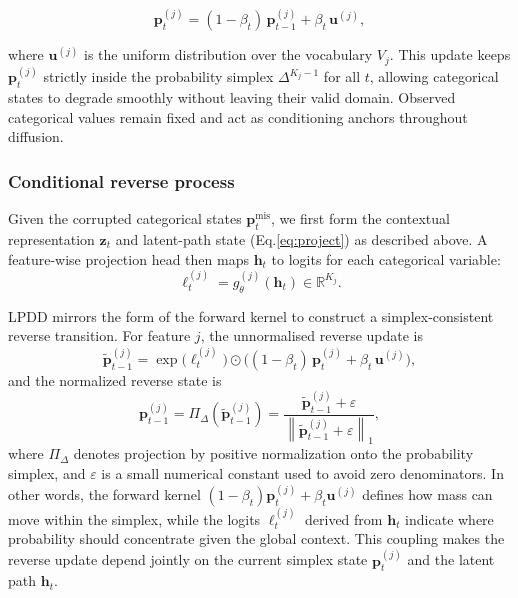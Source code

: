 \documentclass[times, review, 10pt]{elsarticle}
\begin{document}
\[
\mathbf{p}_{t}^{(j)}
= (1-\beta_t)\,\mathbf{p}_{t-1}^{(j)} + \beta_t\,\mathbf{u}^{(j)},
\]

where $\mathbf{u}^{(j)}$ is the uniform distribution over the vocabulary
$V_j$. This update keeps $\mathbf{p}_{t}^{(j)}$ strictly inside the
probability simplex $\Delta^{K_j-1}$ for all $t$, allowing categorical states
to degrade smoothly without leaving their valid domain. Observed categorical
values remain fixed and act as conditioning anchors throughout diffusion.


\subsubsection{Conditional reverse process}

Given the corrupted categorical states $\mathbf{p}_t^{\mathrm{mis}}$, we first
form the contextual representation $\mathbf{z}_t$ and latent-path state
(Eq.\ref{eq:project}) as described
above. A feature-wise projection head then maps $\mathbf{h}_t$ to logits for
each categorical variable:
\begin{equation}
\boldsymbol{\ell}_t^{(j)} = g_\theta^{(j)}(\mathbf{h}_t)
\in \mathbb{R}^{K_j}.
\label{eq:project10}
\end{equation}

LPDD mirrors the form of the forward kernel to construct a
simplex-consistent reverse transition. For feature $j$, the unnormalised
reverse update is
\begin{equation}
\tilde{\mathbf{p}}_{t-1}^{(j)} =
\exp\!\big(\boldsymbol{\ell}_t^{(j)}\big)
\odot
\Big((1-\beta_t)\,\mathbf{p}_t^{(j)} + \beta_t\,\mathbf{u}^{(j)}\Big),
\label{eq:lpdd_unnormalized}
\end{equation}
and the normalized reverse state is
\begin{equation}
\mathbf{p}_{t-1}^{(j)}
=
\Pi_{\Delta}\!\left(\tilde{\mathbf{p}}_{t-1}^{(j)}\right)
=
\frac{\tilde{\mathbf{p}}_{t-1}^{(j)}+\varepsilon}
{\left\|\tilde{\mathbf{p}}_{t-1}^{(j)}+\varepsilon\right\|_1},
\label{eq:lpdd_reverse}
\end{equation}
where $\Pi_{\Delta}$ denotes projection by positive normalization onto the
probability simplex, and $\varepsilon$ is a small numerical constant used to
avoid zero denominators. In other words, the forward kernel
\((1-\beta_t)\mathbf{p}_t^{(j)} + \beta_t\mathbf{u}^{(j)}\) defines how mass
can move within the simplex, while the logits $\boldsymbol{\ell}_t^{(j)}$
derived from $\mathbf{h}_t$ indicate where probability should
concentrate given the global context. This coupling makes the reverse update
depend jointly on the current simplex state $\mathbf{p}_t^{(j)}$ and the
latent path $\mathbf{h}_t$.
\end{document}
